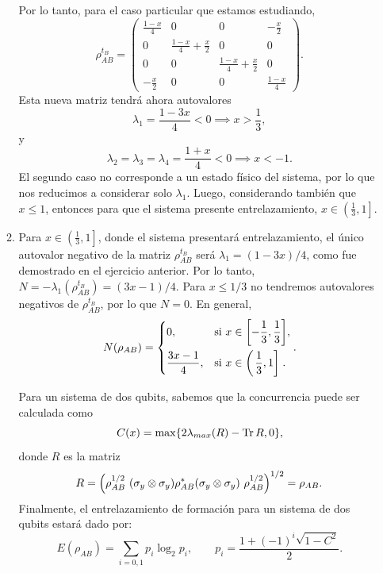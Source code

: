 \documentclass{scrartcl}
\newcommand{\inv}[1]{\frac{1}{#1}}
\DeclareRobustCommand{\[}{\begin{equation}}
\DeclareRobustCommand{\]}{\end{equation}}
\begin{document}
\begin{enumerate}
\begin{enumerate}
        Por lo tanto, para el caso particular que estamos estudiando,
        \[
            \rho^{t_B}_{AB} =
            \begin{pmatrix}
                \frac{1-x}{4} & 0 & 0 & -\frac{x}{2} \\
                0 & \frac{1-x}{4} + \frac{x}{2} & 0 & 0 \\
                0 & 0 & \frac{1-x}{4} + \frac{x}{2} & 0 \\
                -\frac{x}{2} & 0 & 0 & \frac{1-x}{4}
            \end{pmatrix}.
        \]
        Esta nueva matriz tendrá ahora autovalores
        \[ \lambda_1 = \frac{1 - 3x}{4} < 0 \implies x > \frac{1}{3}, \]
        y
        \[ \lambda_2 = \lambda_3 = \lambda_4 = \frac{1+x}{4} < 0 \implies x < -1. \]
        El segundo caso no corresponde a un estado físico del sistema, por lo que nos reducimos a considerar solo $\lambda_1$. Luego, considerando también que $x \leq 1$, entonces para que el sistema presente entrelazamiento, $x \in \left( \left. \inv{3}, 1 \right] \right.$.
        
        
        \item Para $x \in \left( \left. \inv{3}, 1 \right] \right.$, donde el sistema presentará entrelazamiento, el único autovalor negativo de la matriz $\rho^{t_B}_{AB}$ será $\lambda_1 = (1-3x)/4$, como fue demostrado en el ejercicio anterior. Por lo tanto, $N = -\lambda_1(\rho^{t_B}_{AB}) = (3x - 1)/4$. Para $x \leq 1/3$ no tendremos autovalores negativos de $\rho^{t_B}_{AB}$, por lo que $N = 0$. En general,
        \[
            N(\rho_{AB}) =
            \begin{dcases}
                0, &\text{si } x \in \qty[-\inv{3}, \inv{3}], \\
                \frac{3x - 1}{4}, &\text{si } x \in \left( \left. \inv{3}, 1 \right] \right. .
            \end{dcases}.
        \]
        
        Para un sistema de dos qubits, sabemos que la concurrencia puede ser calculada como 
        \[ C(x) = \max \{ 2 \lambda_{max}(R) - \Tr R, 0 \}, \]
        donde $R$ es la matriz
        \[ R = \qty(\rho_{AB}^{1/2} \ (\sigma_y \otimes \sigma_y) \rho_{AB}^* (\sigma_y \otimes \sigma_y) \ \rho_{AB}^{1/2})^{1/2} = \rho_{AB}. \]
        Finalmente, el entrelazamiento de formación para un sistema de dos qubits estará dado por:
        \[ E(\rho_{AB}) = \sum_{i = 0, 1} p_i \log_2 p_i, \quad \quad p_i = \frac{1 + (-1)^i \sqrt{1 - C^2}}{2}. \]
        

\end{enumerate}
\end{enumerate}
\end{document}
